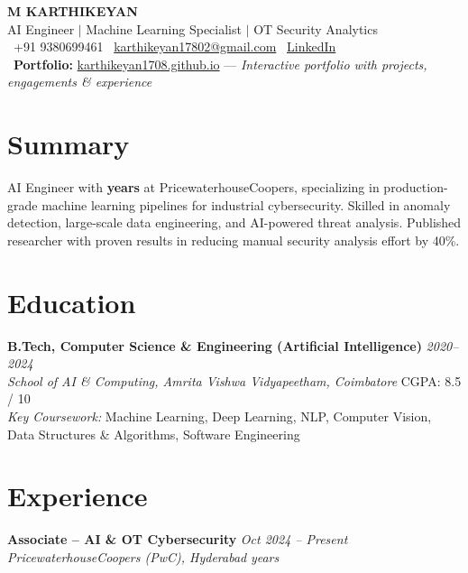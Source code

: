 \documentclass[11pt,letterpaper]{article}
\begin{document}
\begin{center}
{\LARGE \textbf{M KARTHIKEYAN}}\\[4pt]
{\normalsize AI Engineer \(\mid\) Machine Learning Specialist \(\mid\) OT Security Analytics}\\[6pt]
\faPhone\ +91 9380699461 \quad
\faEnvelope\ \href{mailto:karthikeyan17802@gmail.com}{karthikeyan17802@gmail.com} \quad
\faLinkedin\ \href{https://www.linkedin.com/in/karthikeyan-m-10a35a242/}{LinkedIn}\\[4pt]
\faGlobe\ \textbf{Portfolio:} \href{https://karthikeyan1708.github.io}{\textcolor{linkblue}{karthikeyan1708.github.io}} --- \textit{Interactive portfolio with projects, engagements \& experience}
\end{center}

\section{Summary}
AI Engineer with \textbf{ years} at PricewaterhouseCoopers, specializing in production-grade machine learning pipelines for industrial cybersecurity. Skilled in anomaly detection, large-scale data engineering, and AI-powered threat analysis. Published researcher with proven results in reducing manual security analysis effort by 40\%.

\section{Education}
\textbf{B.Tech, Computer Science \& Engineering (Artificial Intelligence)} \hfill \textit{2020--2024}\\
\textit{School of AI \& Computing, Amrita Vishwa Vidyapeetham, Coimbatore} \hfill CGPA: 8.5 / 10\\[2pt]
\textit{Key Coursework:} Machine Learning, Deep Learning, NLP, Computer Vision, Data Structures \& Algorithms, Software Engineering

\section{Experience}
\textbf{Associate -- AI \& OT Cybersecurity} \hfill \textit{Oct 2024 -- Present}\\
\textit{PricewaterhouseCoopers (PwC), Hyderabad} \hfill \textit{ years}
\end{document}
